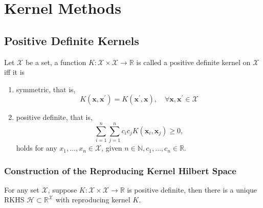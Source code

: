 \chapter{Kernel Methods}

\section{Positive Definite Kernels}

\begin{definition}
    Let $\mathcal{X}$ be a set, a function $K:\mathcal{X}\times\mathcal{X}\rightarrow\mathbb{R}$ is called a positive definite kernel on $\mathcal{X}$ iff it is
    \begin{enumerate}
        \item symmetric, that is,
              \begin{equation}
                  K\left(\mathbf{x},\mathbf{x}^{\prime}\right)=K\left(\mathbf{x}^{\prime},\mathbf{x}\right),\quad\forall\mathbf{x},\mathbf{x}^{\prime}\in\mathcal{X}
              \end{equation}
        \item positive definite, that is,
              \begin{equation}
                  \sum_{i=1}^{n}\sum_{j=1}^{n}c_{i}c_{j}K\left(\mathbf{x}_{i},\mathbf{x}_{j}\right)\geq 0,
              \end{equation}
              holds for any $x_{1},\ldots,x_{n}\in\mathcal{X}$, given $n\in\mathbb{N},c_{1},\ldots,c_{n}\in\mathbb{R}$.
    \end{enumerate}
\end{definition}

\subsection{Construction of the Reproducing Kernel Hilbert Space}

\begin{theorem} \label{thm:morse-aronszajn}
    For any set $\mathcal{X}$, suppose $K:\mathcal{X}\times\mathcal{X}\rightarrow\mathbb{R}$ is positive definite, then there is a unique RKHS $\mathcal{H}\subset\mathbb{R}^{\mathcal{X}}$ with reproducing kernel $K$.
\end{theorem}

